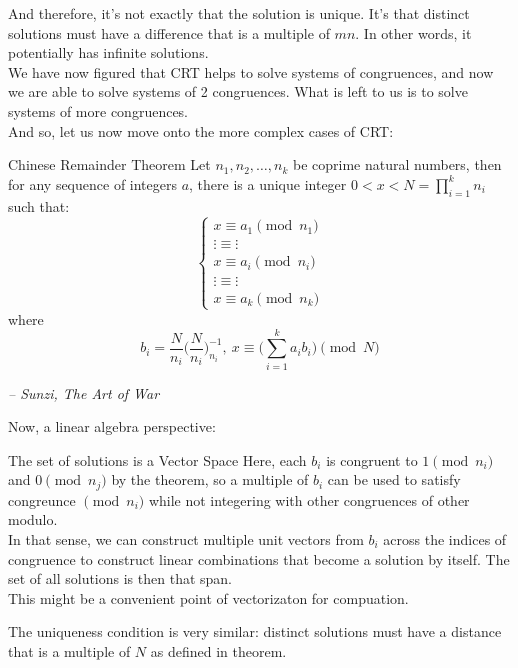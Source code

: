 And therefore, it's not exactly that the solution is unique. It's that distinct solutions must have a difference that is a multiple of $mn$. In other words, it potentially has infinite solutions. \\
We have now figured that CRT helps to solve systems of congruences, and now we are able to solve systems of 2 congruences. What is left to us is to solve systems of more congruences. \\
And so, let us now move onto the more complex cases of CRT:
\begin{ln-theorem}{Chinese Remainder Theorem}{}
    Let $n_1, n_2, \dots, n_k$ be coprime natural numbers, then for any sequence of integers $a$, there is a unique integer $0 < x < N = \prod_{i = 1}^k n_i$ such that:
    \[
        \begin{cases}
            x \equiv a_{1}\pmod{n_1} \\
            \vdots \equiv \vdots \\
            x \equiv a_{i}\pmod{n_i} \\
            \vdots \equiv \vdots \\
            x \equiv a_{k}\pmod{n_k}
        \end{cases}
    \]
    where
    \[b_i = \frac{N}{n_i} \bigg(\frac{N}{n_i} \bigg)_{n_i}^{-1},\ x \equiv \bigg(\sum_{i = 1}^k a_i b_i \bigg)\pmod{N}\]
    \begin{flushright}
        \textit{-- Sunzi, The Art of War}
    \end{flushright}
\end{ln-theorem}
Now, a linear algebra perspective:
\begin{ln-think}{The set of solutions is a Vector Space}{}
    Here, each $b_i$ is congruent to $1\pmod{n_i}$ and $0\pmod{n_j}$ by the theorem, so a multiple of $b_i$ can be used to satisfy congreunce $\pmod{n_i}$ while not integering with other congruences of other modulo. \\
    In that sense, we can construct multiple unit vectors from $b_i$ across the indices of congruence to construct linear combinations that become a solution by itself. The set of all solutions is then that span. \\
    This might be a convenient point of vectorizaton for compuation.
\end{ln-think}
The uniqueness condition is very similar: distinct solutions must have a distance that is a multiple of $N$ as defined in theorem.
